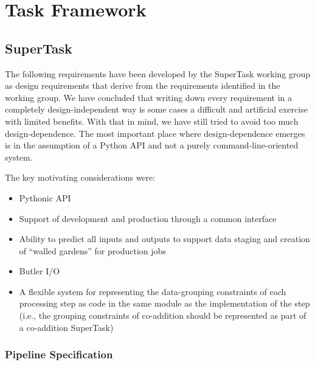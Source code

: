 \documentclass[SE,toc,lsstdraft]{lsstdoc}
\date{2017-07-03}
\begin{document}
\maketitle

\section{Task Framework}

\subsection{SuperTask}

The following requirements have been developed by the SuperTask working group as design requirements that derive from the requirements identified in the working group. We have concluded that writing down every requirement in a completely design-independent way is some cases a difficult and artificial exercise with limited benefits. With that in mind, we have still tried to avoid too much design-dependence. The most important place where design-dependence emerges is in the assumption of a Python API and not a purely command-line-oriented system.

The key motivating considerations were:

    \begin{itemize}
\item
Pythonic API

\item
Support of development and production through a common interface

\item
Ability to predict all inputs and outputs to support data staging and creation of “walled gardens” for production jobs

\item
Butler I/O

\item
A flexible system for representing the data-grouping constraints of each processing step as code in the same module as the implementation of the step (i.e., the grouping constraints of co-addition should be represented as part of a co-addition SuperTask)

    \end{itemize}

\subsubsection{Pipeline Specification}
\end{document}
